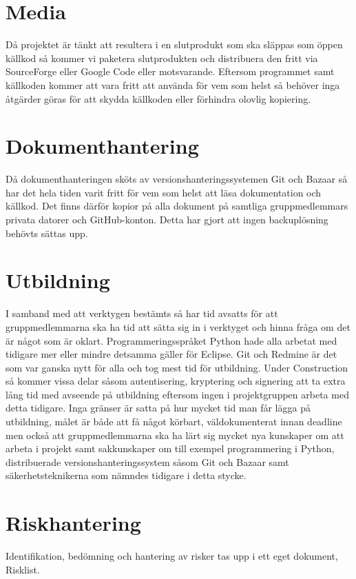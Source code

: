 \section{Media}
Då projektet är tänkt att resultera i en slutprodukt som ska släppas som öppen källkod så kommer vi paketera slutprodukten och distribuera den fritt via SourceForge eller Google Code eller motsvarande. Eftersom programmet samt källkoden kommer att vara fritt att använda för vem som helst så behöver inga åtgärder göras för att skydda källkoden eller förhindra olovlig kopiering.

\section{Dokumenthantering}
Då dokumenthanteringen sköts av versionshanteringssystemen Git och Bazaar så har det hela tiden varit fritt för vem som helst att läsa dokumentation och källkod. Det finns därför kopior på alla dokument på samtliga gruppmedlemmars privata datorer och GitHub-konton. Detta har gjort att ingen backuplösning behövts sättas upp.

\section{Utbildning}
I samband med att verktygen bestämts så har tid avsatts för att gruppmedlemmarna ska ha tid att sätta sig in i verktyget och hinna fråga om det är något som är oklart. Programmeringsspråket Python hade alla arbetat med tidigare mer eller mindre detsamma gäller för Eclipse. Git och Redmine är det som var ganska nytt för alla och tog mest tid för utbildning. Under Construction så kommer vissa delar såsom autentisering, kryptering och signering att ta extra lång tid med avseende på utbildning eftersom ingen i projektgruppen arbeta med detta tidigare. Inga gränser är satta på hur mycket tid man får lägga på utbildning, målet är både att få något körbart, väldokumenterat innan deadline men också att gruppmedlemmarna ska ha lärt sig mycket nya kunskaper om att arbeta i projekt samt sakkunskaper om till exempel programmering i Python, distribuerade versionshanteringssystem såsom Git och Bazaar samt säkerhetsteknikerna som nämndes tidigare i detta stycke.

\section{Riskhantering}
Identifikation, bedömning och hantering av risker tas upp i ett eget dokument, Risklist.


